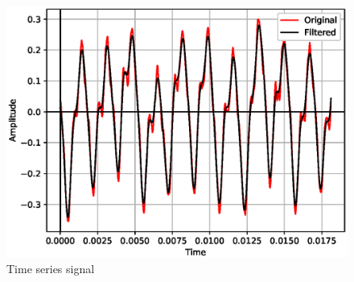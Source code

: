 \documentclass[journal,12pt,twocolumn]{IEEEtran}
\begin{document}
\begin{figure}[!h]
\centering
\includegraphics[width=1\columnwidth]{./figs/ee18btech11051_time_result.eps}
\caption{Time series signal}
\label{fig:Figure2}
\end{figure}
\end{document}
